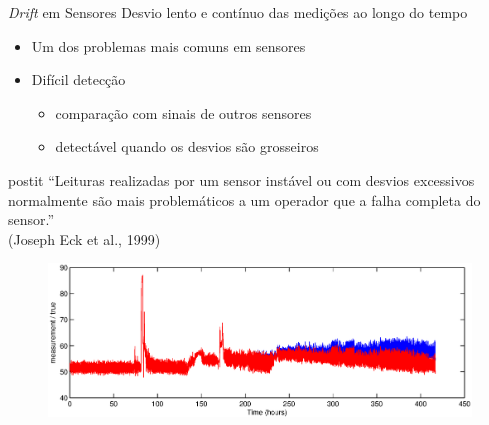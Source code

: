 \documentclass{beamer}
\begin{document}
\begin{frame}{\textit{Drift} em Sensores}
    Desvio lento e contínuo das medições ao longo do tempo

    \begin{itemize}
        \item Um dos problemas mais comuns em sensores
        \item Difícil detecção
            \begin{itemize}
                \item comparação com sinais de outros sensores
                \item detectável quando os desvios são grosseiros
            \end{itemize}
    \end{itemize}

    \begin{beamercolorbox}[sep=5pt]{postit}
        ``Leituras realizadas por um sensor instável ou com desvios excessivos
        normalmente são mais problemáticos a um operador que a falha completa do
        sensor.''\\ \footnotesize(Joseph Eck et al., 1999)
    \end{beamercolorbox}

    \begin{figure}[!htb]
        \centering
        \includegraphics[trim=0pt 0pt 0cm 15pt,clip=true,width=\textwidth]{figuras/drift.eps}
    \end{figure}

\end{frame}
\end{document}
